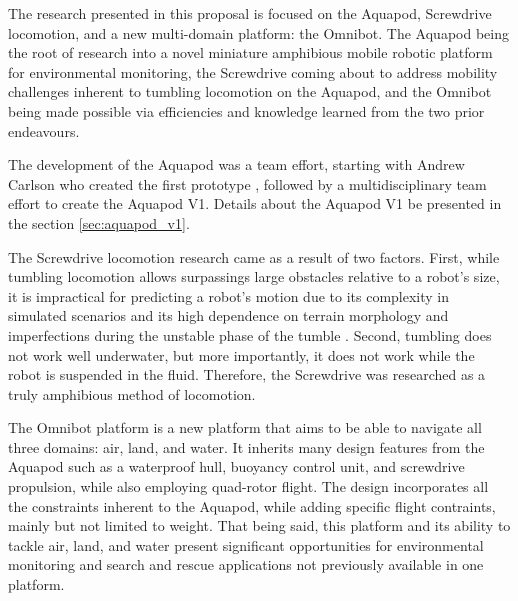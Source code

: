 The research presented in this proposal is focused on the Aquapod, Screwdrive locomotion, and a new multi-domain platform: the Omnibot. The Aquapod being the root of research into a novel miniature amphibious mobile robotic platform for environmental monitoring, the Screwdrive coming about to address mobility challenges inherent to tumbling locomotion on the Aquapod, and the Omnibot being made possible via efficiencies and knowledge learned from the two prior endeavours.  


The development of the Aquapod was a team effort, starting with Andrew Carlson who created the first prototype \cite{Carlson2011}, followed by a multidisciplinary team effort \cite{Dhull2012} to create the Aquapod V1. Details about the Aquapod V1 be presented in the section \ref{sec:aquapod_v1}. 

The Screwdrive locomotion research came as a result of two factors. First, while tumbling locomotion allows surpassings large obstacles relative to a robot's size, it is impractical for predicting a robot's motion due to its complexity in simulated scenarios and its high dependence on terrain morphology and imperfections during the unstable phase of the tumble \cite{Hemes2011a}. Second, tumbling does not work well underwater, but more importantly, it does not work while the robot is suspended in the fluid. Therefore, the Screwdrive was researched as a truly amphibious method of locomotion. 

The Omnibot platform is a new platform that aims to be able to navigate all three domains: air, land, and water. It inherits many design features from the Aquapod such as a waterproof hull, buoyancy control unit, and screwdrive propulsion, while also employing quad-rotor flight. The design incorporates all the constraints inherent to the Aquapod, while adding specific flight contraints, mainly but not limited to weight. That being said, this platform and its ability to tackle air, land, and water present significant opportunities for environmental monitoring and search and rescue applications not previously available in one platform. 




